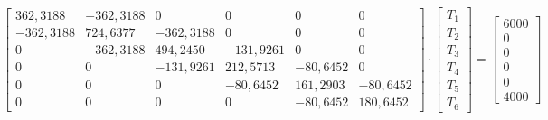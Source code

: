 \begin{equation*}
    \begin{bmatrix}
             362,3188 & -362,3188 &         0 &         0 &         0 &         0  \\
            -362,3188 &  724,6377 & -362,3188 &         0 &         0 &         0  \\
                    0 & -362,3188 &  494,2450 & -131,9261 &         0 &         0  \\
                    0 &         0 & -131,9261 &  212,5713 &  -80,6452 &         0  \\
                    0 &         0 &         0 &  -80,6452 &  161,2903 &  -80,6452  \\
                    0 &         0 &         0 &         0 &  -80,6452 &  180,6452
    \end{bmatrix}
    \cdot
    \begin{bmatrix}
        T_1 \\
        T_2 \\
        T_3 \\
        T_4 \\
        T_5 \\
        T_6
    \end{bmatrix}
    =
    \begin{bmatrix}
        6000 \\
        0 \\
        0 \\
        0 \\
        0 \\
        4000
    \end{bmatrix}
\end{equation*}